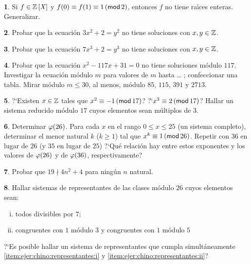\theoremstyle{definition}
\newtheorem{ejerCongruencias}{\ejername}[section]


\begin{ejerCongruencias}
	Si $f\in\polinomios\Enteros$ y $f(0)\equiv f(1)\equiv 1\tmodulo[2]$,
	entonces $f$ no tiene ra\'{\i}ces enteras. Generalizar.
\end{ejerCongruencias}

\begin{ejerCongruencias}
	Probar que la ecuaci\'on $3x^2+2=y^2$ no tiene soluciones con
	$x,y\in\Enteros$.
\end{ejerCongruencias}

\begin{ejerCongruencias}
	Probar que la ecuaci\'on $7x^3+2=y^3$ no tiene soluciones con
	$x,y\in\Enteros$.
\end{ejerCongruencias}

\begin{ejerCongruencias}
	Probar que la ecuaci\'on $x^2-117x+31=0$ no tiene soluciones m\'odulo
	$117$. Investigar la ecuaci\'on m\'odulo $m$ para valores de $m$
	hasta \dots%
	; confeccionar una tabla. Mirar m\'odulo $m\leq 30$, al menos,
	m\'odulo $85$, $115$, $391$ y $2713$.
\end{ejerCongruencias}

\begin{ejerCongruencias}
	?`Existen $x\in\Enteros$ tales que $x^2\equiv -1\tmodulo[17]$?
	?`$x^3\equiv 2\tmodulo[17]$? Hallar un sistema reducido m\'odulo $17$
	cuyos elementos sean m\'ultiplos de $3$.
\end{ejerCongruencias}

\begin{ejerCongruencias}
	Determinar $\eulerphi(26)$. Para cada $x$ en el rango
	$0\leq x\leq 25$ (un sistema completo), determinar el menor
	natural $k$ ($k\geq 1$) tal que $x^k\equiv 1\tmodulo[26]$.
	Repetir con $36$ en lugar de $26$ (y $35$ en lugar de $25$)
	?`Qu\'e relaci\'on hay entre estos exponentes y los valores de
	$\eulerphi(26)$ y de $\eulerphi(36)$, respectivamente?
\end{ejerCongruencias}

\begin{ejerCongruencias}
	Probar que $19\nmid 4n^2+4$ para ning\'un $n$ natural.
\end{ejerCongruencias}

\begin{ejerCongruencias}\label{ejer:congruencias:chino:representantes}
	Hallar sistemas de representantes de las clases m\'odulo $26$
	cuyos elementos sean:
	\begin{enumerate}[(i)]
		\item\label{item:ejer:chino:representantes:i}
			todos divisibles por $7$;
		\item\label{item:ejer:chino:representantes:ii}
			congruentes con $1$ m\'odulo $3$ y congruentes con $1$
			m\'odulo $5$
	\end{enumerate}
	?`Es posible hallar un sistema de representantes que cumpla
	simult\'aneamente \eqref{item:ejer:chino:representantes:i} y
	\eqref{item:ejer:chino:representantes:ii}?
\end{ejerCongruencias}

